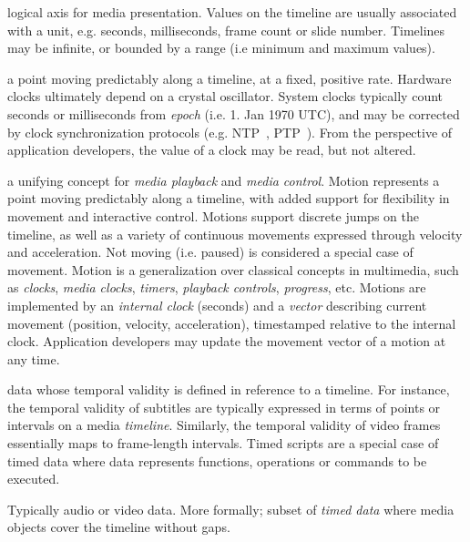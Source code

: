 
logical axis for media presentation. Values on the timeline are usually
associated with a unit, e.g. seconds, milliseconds, frame count or slide
number. Timelines may be infinite, or bounded by a range (i.e minimum and
maximum values).


a point moving predictably along a timeline, at a fixed, positive rate.
Hardware clocks ultimately depend on a crystal oscillator. System clocks
typically count seconds or milliseconds from \emph{epoch} (i.e. 1. Jan 1970
UTC), and may be corrected by clock synchronization protocols (e.g.
NTP~\cite{ntp}, PTP~\cite{ptp}). From the perspective of application
developers, the value of a clock may be read, but not altered.


a unifying concept for \emph{media playback} and \emph{media control}. Motion
represents a point moving predictably along a timeline, with added support for
flexibility in movement and interactive control. Motions support discrete
jumps on the timeline, as well as a variety of continuous movements expressed
through velocity and acceleration. Not moving (i.e. paused) is considered a
special case of movement. Motion is a generalization over classical concepts
in multimedia, such as \emph{clocks}, \emph{media clocks}, \emph{timers},
\emph{playback controls}, \emph{progress}, etc. Motions are implemented by an
\emph{internal clock} (seconds) and a \emph{vector} describing current movement (position,
velocity, acceleration), timestamped relative to the internal clock.
Application developers may update the movement vector of a motion at any time.


data whose temporal validity is defined in reference to a timeline. For
instance, the temporal validity of subtitles are typically expressed in terms
of points or intervals on a media \emph{timeline}. Similarly, the temporal validity
of video frames essentially maps to frame-length intervals. Timed scripts are
a special case of timed data where data represents functions, operations or
commands to be executed.



Typically audio or video data. More formally; subset of \emph{timed data}
where media objects cover the timeline without gaps.



